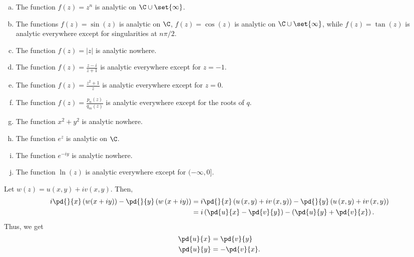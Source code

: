 \documentclass[10pt]{mypackage}
\begin{document}
\RaggedRight
\begin{solution}[18.1]\hfill
  \begin{enumerate}[(a)]
    \item The function $f(z) = z^n$ is analytic on $\C\cup\set{\infty}$.
    \item The functions $f(z) = \sin(z)$ is analytic on $\C$, $f(z) = \cos(z)$ is analytic on $\C\cup\set{\infty}$, while $f(z)= \tan(z)$ is analytic everywhere except for singularities at $n\pi/2$.
    \item The function $f(z) = \left\vert z \right\vert$ is analytic nowhere.
    \item The function $f(z) = \frac{z-i}{z+1}$ is analytic everywhere except for $z = -1$.
    \item The function $f(z) = \frac{z^2 + 1}{z}$ is analytic everywhere except for $z = 0$.
    \item The function $f(z) = \frac{p_n(z)}{q_m(z)}$ is analytic everywhere except for the roots of $q$.
    \item The function $x^2 + y^2$ is analytic nowhere.
    \item The function $e^z$ is analytic on $\C$.
    \item The function $e^{-iy}$ is analytic nowhere.
    \item The function $\ln\left(z\right)$ is analytic everywhere except for $(-\infty,0]$.
  \end{enumerate}
\end{solution}
\begin{solution}[18.2]
  Let $w(z) = u\left(x,y\right) + iv\left(x,y\right)$. Then,
  \begin{align*}
    i\pd{}{x}\left(w(x + iy)\right) - \pd{}{y}\left(w\left(x+ iy\right)\right) &= i \pd{}{x}\left(u\left(x,y\right) + iv\left(x,y\right)\right) - \pd{}{y}\left(u\left(x,y\right) + iv\left(x,y\right)\right)\\
                                                                               &= i\left(\pd{u}{x} - \pd{v}{y}\right) - \left(\pd{u}{y} + \pd{v}{x}\right).
  \end{align*}
  Thus, we get
  \begin{align*}
    \pd{u}{x} &= \pd{v}{y}\\
    \pd{u}{y} &= -\pd{v}{x}.
  \end{align*}
\end{solution}
\begin{solution}[18.4]

\end{solution}
\end{document}
